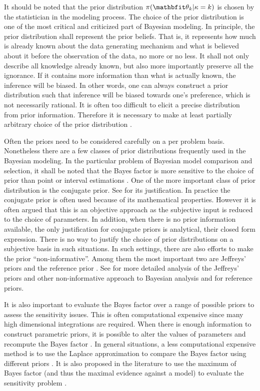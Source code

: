 \documentclass[11pt, hyper, bib, fontset=Minion]{marticle}
\begin{document}
It should be noted that the prior distribution $\pi(\bth_k|\kappa=k)$ is
chosen by the statistician in the modeling process. The choice of the prior
distribution is one of the most critical and criticized part of Bayesian
modeling. In principle, the prior distribution shall represent the prior
beliefs. That is, it represents how much is already known about the data
generating mechanism and what is believed about it before the observation of
the data, no more or no less. It shall not only describe all knowledge already
known, but also more importantly preserve all the ignorance. If it contains
more information than what is actually known, the inference will be biased. In
other words, one can always construct a prior distribution such that inference
will be biased towards one's preference, which is not necessarily rational. It
is often too difficult to elicit a precise distribution from prior
information.  Therefore it is necessary to make at least partially arbitrary
choice of the prior distribution
\parencites{Robert:2007tc}[][chap.~3]{Kass:1995vb}.

Often the priors need to be considered carefully on a per problem basis.
Nonetheless there are a few classes of prior distributions frequently used in
the Bayesian modeling. In the particular problem of Bayesian model comparison
and selection, it shall be noted that the Bayes factor is more sensitive to
the choice of prior than point or interval estimations \parencite{Kass:1993vy,
  Kass:1995vb}. One of the more important class of prior distribution is the
conjugate prior. See \textcite[][chap.~5]{Bernardo:1994vd} for its
justification.  In practice the conjugate prior is often used because of its
mathematical properties. However it is often argued that this is an objective
approach as the subjective input is reduced to the choice of parameters. In
addition, when there is no prior information available, the only justification
for conjugate priors is analytical, their closed form expression. There is no
way to justify the choice of prior distributions on a subjective basis in such
situations. In such settings, there are also efforts to make the prior
``non-informative''.  Among them the most important two are Jeffreys' priors
\parencite{Jeffreys:1946jf} and the reference prior
\parencite{Bernardo:1979uq}. See \textcite{Kass:1996jj} for more detailed
analysis of the Jeffreys' priors and other non-informative approach to
Bayesian analysis and \textcite{Berger:1989vj, Berger:1992kf, Berger:1992wo}
for reference priors.

It is also important to evaluate the Bayes factor over a range of possible
priors to assess the sensitivity issues. This is often computational expensive
since many high dimensional integrations are required. When there is enough
information to construct parametric priors, it is possible to alter the values
of parameters and recompute the Bayes factor
\parencite[e.g.,][]{McCulloch:1991hj}. In general situations, a less
computational expensive method is to use the Laplace approximation to compare
the Bayes factor using different priors \parencite[e.g.,][]{Kass:1992tz}. It
is also proposed in the literature to use the maximum of Bayes factor (and
thus the maximal evidence against a model) to evaluate the sensitivity problem
\parencite[e.g.,][]{Berger:1987iq}.
\end{document}
